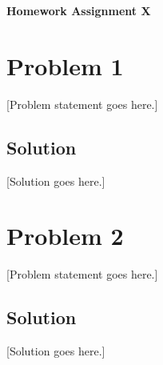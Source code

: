 \documentclass{article}
\begin{document}
\begin{center}
\large{\textbf{Homework Assignment X}}
\end{center}

\section*{Problem 1}

[Problem statement goes here.]

\subsection*{Solution}

[Solution goes here.]

\section*{Problem 2}

[Problem statement goes here.]

\subsection*{Solution}

[Solution goes here.]
\end{document}
